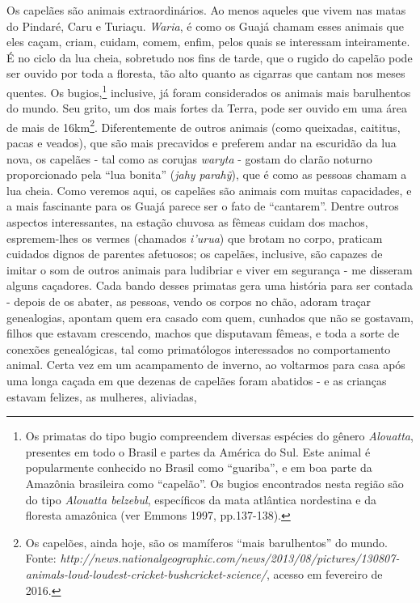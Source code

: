 Os capelães são animais extraordinários. Ao menos aqueles que vivem nas
matas do Pindaré, Caru e Turiaçu. \emph{Waria}, é como os Guajá chamam
esses animais que eles caçam, criam, cuidam, comem, enfim, pelos quais
se interessam inteiramente. É no ciclo da lua cheia, sobretudo nos fins
de tarde, que o rugido do capelão pode ser ouvido por toda a floresta,
tão alto quanto as cigarras que cantam nos meses quentes. Os
bugios,\footnote{Os primatas do tipo bugio compreendem diversas espécies
  do gênero \emph{Alouatta}, presentes em todo o Brasil e partes da
  América do Sul. Este animal é popularmente conhecido no Brasil como
  ``guariba'', e em boa parte da Amazônia brasileira como ``capelão''.
  Os bugios encontrados nesta região são do tipo \emph{Alouatta
  belzebul}, específicos da mata atlântica nordestina e da floresta
  amazônica (ver Emmons 1997, pp.137-138).} inclusive, já foram
considerados os animais mais barulhentos do mundo. Seu grito, um dos
mais fortes da Terra, pode ser ouvido em uma área de mais de
16km\footnote{Os capelões, ainda hoje, são os mamíferos ``mais
  barulhentos'' do mundo. Fonte:
  \emph{http://news.nationalgeographic.com/news/2013/08/pictures/130807-animals-loud-loudest-cricket-bushcricket-science/},
  acesso em fevereiro de 2016.}. Diferentemente de outros animais (como
queixadas, caititus, pacas e veados), que são mais precavidos e preferem
andar na escuridão da lua nova, os capelães - tal como as corujas
\emph{waryta} - gostam do clarão noturno proporcionado pela ``lua
bonita'' (\emph{jahy parahỹ}), que é como as pessoas chamam a lua cheia.
Como veremos aqui, os capelães são animais com muitas capacidades, e a
mais fascinante para os Guajá parece ser o fato de ``cantarem''. Dentre
outros aspectos interessantes, na estação chuvosa as fêmeas cuidam dos
machos, espremem-lhes os vermes (chamados \emph{i'urua}) que brotam no
corpo, praticam cuidados dignos de parentes afetuosos; os capelães,
inclusive, são capazes de imitar o som de outros animais para ludibriar
e viver em segurança - me disseram alguns caçadores. Cada bando desses
primatas gera uma história para ser contada - depois de os abater, as
pessoas, vendo os corpos no chão, adoram traçar genealogias, apontam
quem era casado com quem, cunhados que não se gostavam, filhos que
estavam crescendo, machos que disputavam fêmeas, e toda a sorte de
conexões genealógicas, tal como primatólogos interessados no
comportamento animal. Certa vez em um acampamento de inverno, ao
voltarmos para casa após uma longa caçada em que dezenas de capelães
foram abatidos - e as crianças estavam felizes, as mulheres, aliviadas,
